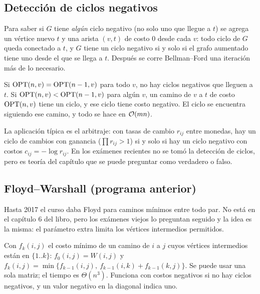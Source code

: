 \subsection{Detección de ciclos negativos}

Para saber si $G$ tiene \emph{algún} ciclo negativo (no solo uno que llegue a
$t$) se agrega un vértice nuevo $t$ y una arista $(v,t)$ de costo 0 desde
cada $v$: todo ciclo de $G$ queda conectado a $t$, y $G$ tiene un ciclo
negativo si y solo si el grafo aumentado tiene uno desde el que se llega a
$t$. Después se corre Bellman--Ford una iteración más de lo necesario.

\begin{resultado}[(6.30) y (6.31)]
Si $\mathrm{OPT}(n,v)=\mathrm{OPT}(n-1,v)$ para todo $v$, no hay ciclos negativos que
lleguen a $t$. Si $\mathrm{OPT}(n,v)<\mathrm{OPT}(n-1,v)$ para algún $v$, un camino de $v$ a
$t$ de costo $\mathrm{OPT}(n,v)$ tiene un ciclo, y ese ciclo tiene costo negativo.
El ciclo se encuentra siguiendo ese camino, y todo se hace en $\mathcal{O}(mn)$.
\end{resultado}

La aplicación típica es el arbitraje: con tasas de cambio $r_{ij}$ entre
monedas, hay un ciclo de cambios con ganancia ($\prod r_{ij}>1$) si y solo si
hay un ciclo negativo con costos $c_{ij}=-\log r_{ij}$. En los exámenes
recientes no se tomó la detección de ciclos, pero es teoría del capítulo
que se puede preguntar como verdadero o falso.

\subsection{Floyd--Warshall (programa anterior)}

Hasta 2017 el curso daba Floyd para caminos mínimos entre todo par. No está
en el capítulo 6 del libro, pero los exámenes viejos lo preguntan seguido y
la idea es la misma: el parámetro extra limita los vértices intermedios
permitidos.

\begin{resultado}[Floyd]
Con $f_k(i,j)$ el costo mínimo de un camino de $i$ a $j$ cuyos vértices
intermedios están en $\{1..k\}$: $f_0(i,j)=W(i,j)$ y
$f_k(i,j)=\min\{f_{k-1}(i,j),\ f_{k-1}(i,k)+f_{k-1}(k,j)\}$. Se puede usar
una sola matriz; el tiempo es $\Theta(n^3)$. Funciona con costos negativos si
no hay ciclos negativos, y un valor negativo en la diagonal indica uno.
\end{resultado}

